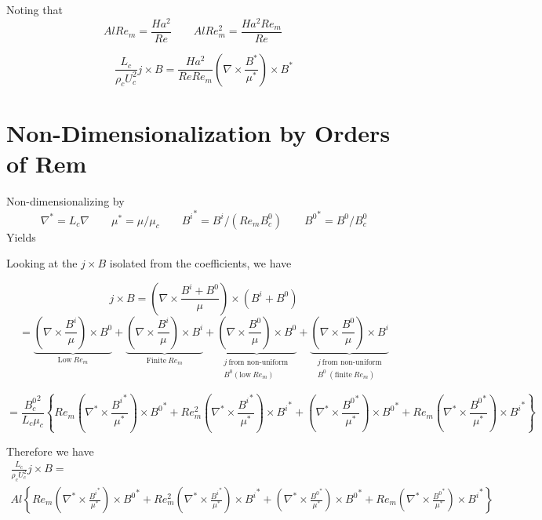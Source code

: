 \documentclass[11pt]{article}
\begin{document}
Noting that
\begin{equation}
	Al Re_m = \frac{Ha^2}{Re} \qquad
	Al Re_m^2 = \frac{Ha^2 Re_m}{Re} \qquad
\end{equation}

\begin{equation}
	\boxed{
	 \frac{L_c}{\rho_c U_c^2} j \times B
	 =
	\frac{Ha^2}{Re Re_m} \left( \nabla \times \frac{B^*}{\mu^*} \right) \times B^*
	}
\end{equation}

\section{Non-Dimensionalization by Orders of Rem}
Non-dimensionalizing by
\begin{equation}
	\nabla^* = L_c \nabla \qquad
	\mu^* = \mu / \mu_c \qquad
	{B^{i}}^* = B^{i}/(Re_m B_c^0) \qquad
	{B^0}^* = B^0/B_c^0
\end{equation}
Yields

Looking at the $j \times B$ isolated from the coefficients, we have

\begin{equation}
	j \times B
	=
	\left( \nabla \times \frac{B^{i}+B^0}{\mu} \right) \times (B^{i}+B^0)
\end{equation}
\begin{equation}
	=
	\underbrace{\left( \nabla \times \frac{B^{i}}{\mu} \right) \times B^0}_
	{\text{Low}\ Re_m}
	+
	\underbrace{\left( \nabla \times \frac{B^{i}}{\mu} \right) \times B^{i}}_
	{\text{Finite}\ Re_m}
	+
	\underbrace{\left( \nabla \times \frac{B^0}{\mu} \right) \times B^0}_
	{\substack{j\ \text{from non-uniform}\ \\ B^0 (\text{low}\ Re_m)}}
	+
	\underbrace{\left( \nabla \times \frac{B^0}{\mu} \right) \times B^{i}}_
	{\substack{j \ \text{from non-uniform} \\ B^0 \ (\text{finite}\ Re_m)}}
\end{equation}

\begin{equation}
	=
	\frac{{B_c^0}^2}{L_c \mu_c}
	\left\{
	Re_m \left( \nabla^* \times \frac{{B^{i}}^*}{\mu^*} \right) \times {B^0}^*
	+
	Re_m^2 \left( \nabla^* \times \frac{{B^{i}}^*}{\mu^*} \right) \times {B^{i}}^*
	+
	\left( \nabla^* \times \frac{{B^0}^*}{\mu^*} \right) \times {B^0}^*
	+
	Re_m \left( \nabla^* \times \frac{{B^0}^*}{\mu^*} \right) \times {B^{i}}^*
	\right\}
\end{equation}

Therefore we have
\begin{multline}
	 \frac{L_c}{\rho_c U_c^2} j \times B
	 = \\
	 Al
	\left\{
	Re_m \left( \nabla^* \times \frac{{B^{i}}^*}{\mu^*} \right) \times {B^0}^*
	+
	Re_m^2 \left( \nabla^* \times \frac{{B^{i}}^*}{\mu^*} \right) \times {B^{i}}^*
	+
	\left( \nabla^* \times \frac{{B^0}^*}{\mu^*} \right) \times {B^0}^*
	+
	Re_m \left( \nabla^* \times \frac{{B^0}^*}{\mu^*} \right) \times {B^{i}}^*
	\right\}
\end{multline}
\end{document}
